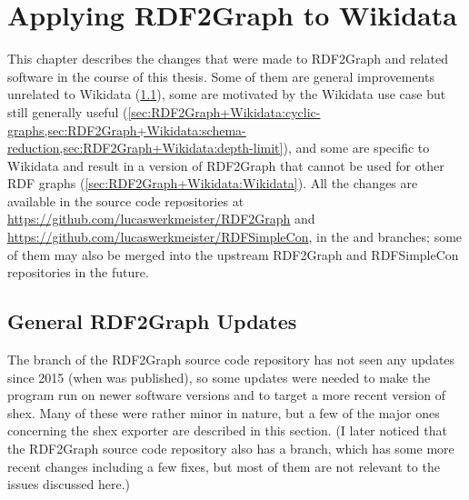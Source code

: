 
\chapter{Applying RDF2Graph to Wikidata}
\label{ch:RDF2Graph+Wikidata}

This chapter describes the changes that were made to \gls{RDF2Graph} and related software in the course of this thesis.
Some of them are general improvements unrelated to \gls{Wikidata} (\cref{sec:RDF2Graph+Wikidata:updates}),
some are motivated by the \gls{Wikidata} use case but still generally useful (\cref{sec:RDF2Graph+Wikidata:cyclic-graphs,sec:RDF2Graph+Wikidata:schema-reduction,sec:RDF2Graph+Wikidata:depth-limit}),
and some are specific to \gls{Wikidata} and result in a version of \gls{RDF2Graph}
that cannot be used for other RDF graphs (\cref{sec:RDF2Graph+Wikidata:Wikidata}).
All the changes are available in the source code repositories at
\url{https://github.com/lucaswerkmeister/RDF2Graph} and
\url{https://github.com/lucaswerkmeister/RDFSimpleCon},
in the  and  branches;
some of them may also be merged into the upstream \gls{RDF2Graph} and \gls{RDFSimpleCon} repositories in the future.

\section{General RDF2Graph Updates}
\label{sec:RDF2Graph+Wikidata:updates}

The  branch of the \gls{RDF2Graph} source code repository
has not seen any updates since 2015 (when \cite{vanDam2015} was published), %
so some updates were needed to make the program run on newer software versions
and to target a more recent version of \gls{shex}.
Many of these were rather minor in nature,
but a few of the major ones concerning the \gls{shex} exporter are described in this section.
(I later noticed that the \gls{RDF2Graph} source code repository
also has a  branch,
which has some more recent changes including a few fixes,
but most of them are not relevant to the issues discussed here.)


